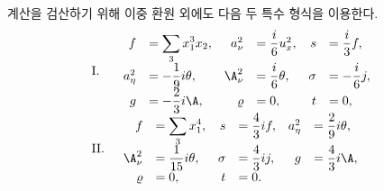 
계산을 검산하기 위해 \glqq{}이중 환원\grqq{} 외에도 다음 두 특수 형식을 이용한다.
\[
\begin{array}{ll}
\text{I.}&\begin{array}{rlrlrl}
f&=\displaystyle\sum_3x_1^3x_2,& a_\nu^2&=\dfrac{i}{6}u_x^2,& s&=\dfrac{i}{3}f,\\
a_\eta^2&=-\dfrac19i\theta,& \A_\nu^2&=\dfrac{i}{6}\theta,& \sigma&=-\dfrac{i}{6}j,\\
g&=-\dfrac23i\A,& \varrho&=0,& t&=0,
\end{array}\\[1.2em]
\text{II.}&\begin{array}{rlrlrl}
f&=\displaystyle\sum_3x_1^4,& s&=\dfrac43if,& a_\eta^2&=\dfrac29i\theta,\\
\A_\nu^2&=\dfrac1{15}i\theta,& \sigma&=\dfrac43ij,& g&=\dfrac43i\A,\\
\varrho&=0,& t&=0.
\end{array}
\end{array}
\]
